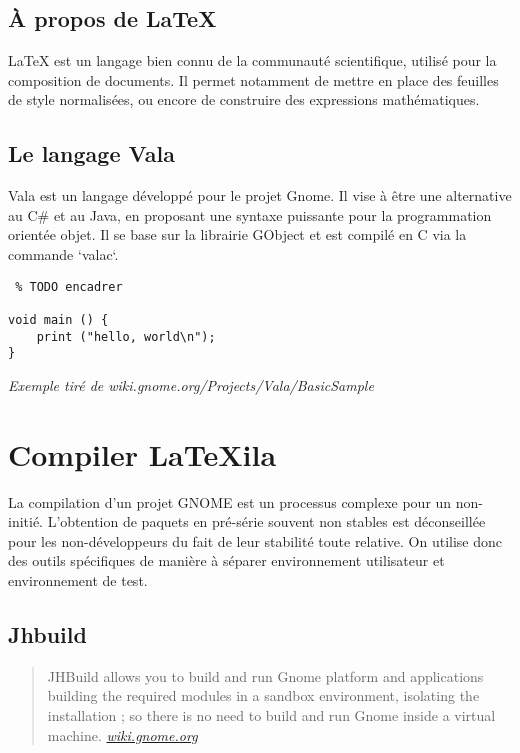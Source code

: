 \documentclass[a4paper,11pt]{report}
\begin{document}
%


\subsection{À propos de \LaTeX}
LaTeX est un langage bien connu de la communauté scientifique, utilisé pour la composition de documents. Il permet notamment de mettre en place des feuilles de style normalisées, ou encore de construire des expressions mathématiques.

\subsection{Le langage Vala}
\label{sub:vala}
Vala est un langage développé pour le projet Gnome. Il vise à être une alternative au C\# et au Java, en proposant une syntaxe puissante pour la programmation orientée objet. Il se base sur la librairie GObject et est compilé en C via la commande `valac`.
\begin{lstlisting} % TODO encadrer

void main () {
    print ("hello, world\n");
}

\end{lstlisting}\textit{Exemple tiré de wiki.gnome.org/Projects/Vala/BasicSample}

\section{Compiler LaTeXila}
\label{cha:compiler}
La compilation d'un projet GNOME est un processus complexe pour un non-initié. L'obtention de paquets en pré-série souvent non stables est déconseillée pour les non-développeurs du fait de leur stabilité toute relative. On utilise donc des outils spécifiques de manière à séparer environnement utilisateur et environnement de test. 

\subsection{Jhbuild}
\label{sub:jhbuild}

\begin{quote}
JHBuild allows you to build and run Gnome platform and applications building the required modules in a sandbox environment, isolating the installation ; so there is no need to build and run Gnome inside a virtual machine. \textit{\url{wiki.gnome.org}}
\end{quote}
\end{document}
